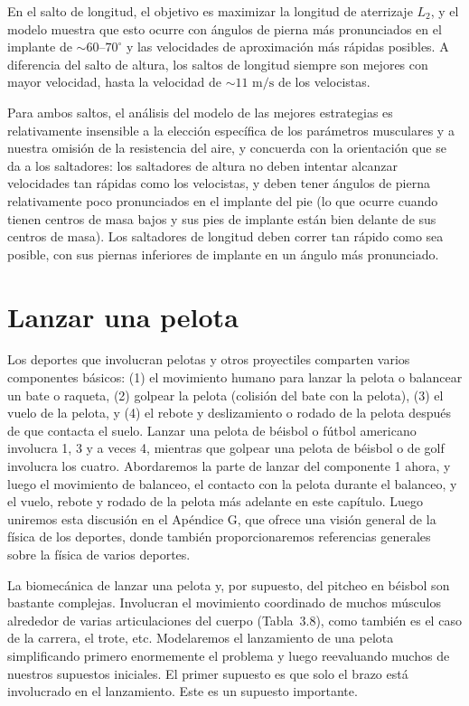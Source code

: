 \documentclass[12pt]{book}
\begin{document}
En el salto de longitud, el objetivo es maximizar la longitud de aterrizaje $L_2$, y el modelo muestra que esto ocurre con ángulos de pierna más pronunciados en el implante de $\sim 60$--$70^\circ$ y las velocidades de aproximación más rápidas posibles. A diferencia del salto de altura, los saltos de longitud siempre son mejores con mayor velocidad, hasta la velocidad de $\sim 11\text{ m/s}$ de los velocistas.

Para ambos saltos, el análisis del modelo de las mejores estrategias es relativamente insensible a la elección específica de los parámetros musculares y a nuestra omisión de la resistencia del aire, y concuerda con la orientación que se da a los saltadores: los saltadores de altura no deben intentar alcanzar velocidades tan rápidas como los velocistas, y deben tener ángulos de pierna relativamente poco pronunciados en el implante del pie (lo que ocurre cuando tienen centros de masa bajos y sus pies de implante están bien delante de sus centros de masa). Los saltadores de longitud deben correr tan rápido como sea posible, con sus piernas inferiores de implante en un ángulo más pronunciado.

\section{Lanzar una pelota}

Los deportes que involucran pelotas y otros proyectiles comparten varios componentes básicos: (1) el movimiento humano para lanzar la pelota o balancear un bate o raqueta, (2) golpear la pelota (colisión del bate con la pelota), (3) el vuelo de la pelota, y (4) el rebote y deslizamiento o rodado de la pelota después de que contacta el suelo. Lanzar una pelota de béisbol o fútbol americano involucra 1, 3 y a veces 4, mientras que golpear una pelota de béisbol o de golf involucra los cuatro. Abordaremos la parte de lanzar del componente 1 ahora, y luego el movimiento de balanceo, el contacto con la pelota durante el balanceo, y el vuelo, rebote y rodado de la pelota más adelante en este capítulo. Luego uniremos esta discusión en el Apéndice G, que ofrece una visión general de la física de los deportes, donde también proporcionaremos referencias generales sobre la física de varios deportes.

La biomecánica de lanzar una pelota y, por supuesto, del pitcheo en béisbol son bastante complejas. Involucran el movimiento coordinado de muchos músculos alrededor de varias articulaciones del cuerpo (Tabla~3.8), como también es el caso de la carrera, el trote, etc. Modelaremos el lanzamiento de una pelota simplificando primero enormemente el problema y luego reevaluando muchos de nuestros supuestos iniciales. El primer supuesto es que solo el brazo está involucrado en el lanzamiento. Este es un supuesto importante.
\end{document}
